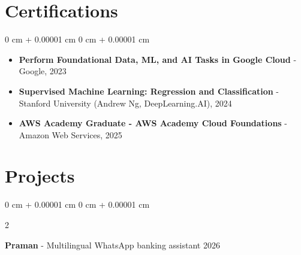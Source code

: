 \documentclass[10pt, letterpaper]{article}
\newenvironment{highlights}{
    \begin{itemize}[
        topsep=0.10 cm,
        parsep=0.10 cm,
        partopsep=0pt,
        itemsep=0pt,
        leftmargin=0 cm + 10pt
    ]
}{
    \end{itemize}
} %
\newenvironment{onecolentry}{
    \begin{adjustwidth}{
        0 cm + 0.00001 cm
    }{
        0 cm + 0.00001 cm
    }
}{
    \end{adjustwidth}
} %
\newenvironment{twocolentry}[2][]{
    \onecolentry
    \def\secondColumn{#2}
    \setcolumnwidth{\fill, 4.5 cm}
    \begin{paracol}{2}
}{
    \switchcolumn \raggedleft \secondColumn
    \end{paracol}
    \endonecolentry
} %
\begin{document}




    \section{Certifications}
        \begin{onecolentry}
            \begin{itemize}
                \item \textbf{Perform Foundational Data, ML, and AI Tasks in Google Cloud} - Google, 2023
                \item \textbf{Supervised Machine Learning: Regression and Classification} - Stanford University (Andrew Ng, DeepLearning.AI), 2024
                \item \textbf{AWS Academy Graduate - AWS Academy Cloud Foundations} - Amazon Web Services, 2025
            \end{itemize}
        \end{onecolentry}


    
    
    \section{Projects}

        \begin{twocolentry}{
            2026
        }
            \textbf{Praman} - Multilingual WhatsApp banking assistant \end{twocolentry}
\end{document}
